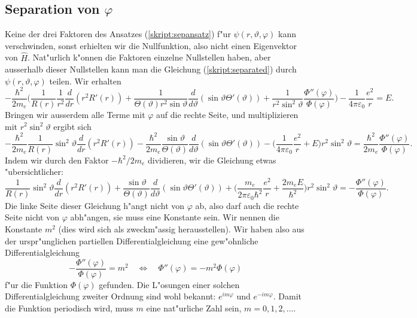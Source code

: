 \subsection{Separation von $\varphi$}
Keine der drei Faktoren des Ansatzes (\ref{skript:sepansatz}) f"ur
$\psi(r,\vartheta,\varphi)$ kann verschwinden, sonst erhielten wir die 
Nullfunktion, also nicht einen Eigenvektor von $\hat H$.
Nat"urlich k"onnen die Faktoren einzelne Nullstellen haben, aber ausserhalb
dieser Nullstellen kann man die Gleichung (\ref{skript:separated}) durch 
$\psi(r,\vartheta,\varphi)$ teilen. Wir erhalten
\begin{equation*}
-\frac{\hbar^2}{2m_e}\biggl(
\frac{1}{R(r)}
\frac{1}{r^2}
\frac{d}{dr}(r^2R'(r))
+
\frac{1}{\Theta(\vartheta) r^2\sin\vartheta}\frac{d}{d\vartheta}(\sin\vartheta \Theta'(\vartheta))
+
\frac{1}{r^2\sin^2\vartheta}\frac{\Phi''(\varphi)}{\Phi(\varphi)}
\biggr)
-\frac1{4\pi\varepsilon_0}\frac{e^2}{r}
=
E.
\end{equation*}
Bringen wir ausserdem alle Terme mit $\varphi$ auf die rechte Seite,
und multiplizieren mit $r^2\sin^2\vartheta$
ergibt sich
\begin{equation*}
-\frac{\hbar^2}{2m_e}
\frac{1}{R(r)}\sin^2\vartheta \frac{d}{dr}(r^2R'(r))
-
\frac{\hbar^2}{2m_e}
\frac{\sin\vartheta}{\Theta(\vartheta) }\frac{d}{d\vartheta}(\sin\vartheta \Theta'(\vartheta))
-\biggl(\frac1{4\pi\varepsilon_0}\frac{e^2}{r}
+
E\biggr)r^2\sin^2\vartheta
=
\frac{\hbar^2}{2m_e}\frac{\Phi''(\varphi)}{\Phi(\varphi)}.
\end{equation*}
Indem wir durch den Faktor $-\hbar^2/2m_e$ dividieren, wir die Gleichung
etwas "ubersichtlicher:
\begin{equation}
\frac{1}{R(r)}\sin^2\vartheta \frac{d}{dr}(r^2R'(r))
+
\frac{\sin\vartheta}{\Theta(\vartheta) }\frac{d}{d\vartheta}(\sin\vartheta \Theta'(\vartheta))
+\biggl(\frac{m_e}{2\pi\varepsilon_0\hbar^2}\frac{e^2}{r}
+
\frac{2m_eE}{\hbar^2}\biggr)r^2\sin^2\vartheta
=
-\frac{\Phi''(\varphi)}{\Phi(\varphi)}.
\label{skript:phisepariert}
\end{equation}
Die linke Seite dieser Gleichung h"angt nicht von $\varphi$ ab, also
darf auch die rechte Seite nicht von $\varphi$ abh"angen, sie muss
eine Konstante sein. Wir nennen die Konstante $m^2$ (dies wird sich
als zweckm"as\-sig herausstellen). Wir haben also aus der urspr"unglichen
partiellen Differentialgleichung eine gew"ohnliche Differentialgleichung
\[
-\frac{\Phi''(\varphi)}{\Phi(\varphi)}=m^2
\quad\Leftrightarrow\quad
\Phi''(\varphi)=-m^2\Phi(\varphi)
\]
f"ur die Funktion $\Phi(\varphi)$ gefunden.
Die L"osungen einer solchen Differentialgleichung zweiter Ordnung sind
wohl bekannt: $e^{im\varphi}$ und $e^{-im\varphi}$. Damit die Funktion
periodisch wird, muss $m$ eine nat"urliche Zahl sein, $m=0,1,2,\dots$.

